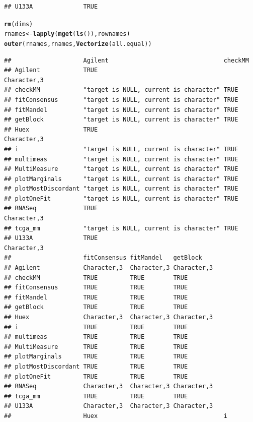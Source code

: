 \documentclass{article}\usepackage[]{graphicx}\usepackage[]{color}
\makeatletter
\newcommand{\hlstd}[1]{\textcolor[rgb]{0.345,0.345,0.345}{#1}}%
\newcommand{\hlkwb}[1]{\textcolor[rgb]{0.69,0.353,0.396}{#1}}%
\newcommand{\hlkwd}[1]{\textcolor[rgb]{0.737,0.353,0.396}{\textbf{#1}}}%
\newenvironment{kframe}{%
 \def\at@end@of@kframe{}%
 \ifinner\ifhmode%
  \def\at@end@of@kframe{\end{minipage}}%
  \begin{minipage}{\columnwidth}%
 \fi\fi%
 \def\FrameCommand##1{\hskip\@totalleftmargin \hskip-\fboxsep
 \colorbox{shadecolor}{##1}\hskip-\fboxsep
     \hskip-\linewidth \hskip-\@totalleftmargin \hskip\columnwidth}%
 \MakeFramed {\advance\hsize-\width
   \@totalleftmargin\z@ \linewidth\hsize
   \@setminipage}}%
 {\par\unskip\endMakeFramed%
 \at@end@of@kframe}
\newenvironment{knitrout}{}{} %
\makeatother
\begin{document}
\begin{knitrout}
\begin{kframe}
\begin{verbatim}
## U133A              TRUE
\end{verbatim}
\begin{alltt}
\hlkwd{rm}\hlstd{(dims)}
\hlstd{rnames} \hlkwb{<-} \hlkwd{lapply}\hlstd{(}\hlkwd{mget}\hlstd{(}\hlkwd{ls}\hlstd{()), rownames)}
\hlkwd{outer}\hlstd{(rnames, rnames,} \hlkwd{Vectorize}\hlstd{(all.equal))}
\end{alltt}
\begin{verbatim}
##                    Agilent                                checkMM    
## Agilent            TRUE                                   Character,3
## checkMM            "target is NULL, current is character" TRUE       
## fitConsensus       "target is NULL, current is character" TRUE       
## fitMandel          "target is NULL, current is character" TRUE       
## getBlock           "target is NULL, current is character" TRUE       
## Huex               TRUE                                   Character,3
## i                  "target is NULL, current is character" TRUE       
## multimeas          "target is NULL, current is character" TRUE       
## MultiMeasure       "target is NULL, current is character" TRUE       
## plotMarginals      "target is NULL, current is character" TRUE       
## plotMostDiscordant "target is NULL, current is character" TRUE       
## plotOneFit         "target is NULL, current is character" TRUE       
## RNASeq             TRUE                                   Character,3
## tcga_mm            "target is NULL, current is character" TRUE       
## U133A              TRUE                                   Character,3
##                    fitConsensus fitMandel   getBlock   
## Agilent            Character,3  Character,3 Character,3
## checkMM            TRUE         TRUE        TRUE       
## fitConsensus       TRUE         TRUE        TRUE       
## fitMandel          TRUE         TRUE        TRUE       
## getBlock           TRUE         TRUE        TRUE       
## Huex               Character,3  Character,3 Character,3
## i                  TRUE         TRUE        TRUE       
## multimeas          TRUE         TRUE        TRUE       
## MultiMeasure       TRUE         TRUE        TRUE       
## plotMarginals      TRUE         TRUE        TRUE       
## plotMostDiscordant TRUE         TRUE        TRUE       
## plotOneFit         TRUE         TRUE        TRUE       
## RNASeq             Character,3  Character,3 Character,3
## tcga_mm            TRUE         TRUE        TRUE       
## U133A              Character,3  Character,3 Character,3
##                    Huex                                   i          

\end{verbatim}
\end{kframe}
\end{knitrout}
\end{document}
